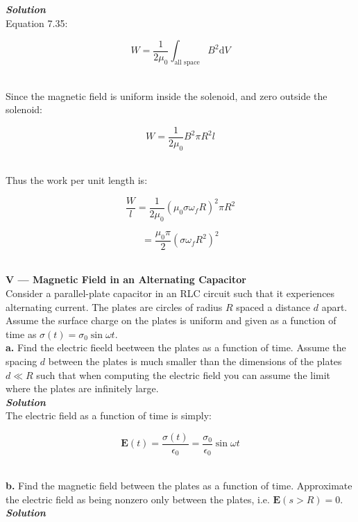 \documentclass[14pt]{extarticle}
\renewcommand{\v}[1]{{\bm #1}}
\newcommand{\bfit}[1]{\textbf{\textit{#1}}}
\renewcommand{\d}{\text{d}}
\newcommand{\eo}{\epsilon_0}
\newcommand{\muo}{\mu_0}
\begin{document}
{\bfit{Solution}} \\ 

Equation 7.35:

$$W = \frac{1}{2\muo} \int_{\text{all space}} B^2 \d V$$ \ 

Since the magnetic field is uniform inside the solenoid, and zero outside the solenoid:

$$W = \frac{1}{2\muo} B^2 \pi R^2 l$$ \ 

Thus the work per unit length is:

$$\frac Wl = \frac{1}{2\muo} (\muo \sigma\omega_f R)^2 \pi R^2$$ 

$$= \frac{\muo \pi}{2} (\sigma\omega_f R^2)^2$$ \ 






\hrulefill 

\hfill 

{\LARGE \bf V --- Magnetic Field in an Alternating Capacitor} \\ 

Consider a parallel-plate capacitor in an RLC circuit such that it experiences alternating current. The plates are circles of radius $R$ spaced a distance $d$ apart. Assume the surface charge on the plates is uniform and given as a function of time as $\sigma(t) = \sigma_0\sin\omega t$.  \\ 

{\Large \bf a.} Find the electric fieeld beetween the plates as a function of time. Assume the spacing $d$ between the plates is much smaller than the dimensions of the plates $ d \ll R$ such that when computing the electric field you can assume the limit where the plates are infinitely large. \\ 

{\bfit{Solution}}  \\ 

The electric field as a function of time is simply: 

$$\v E(t) = \frac{\sigma(t)}{\eo} = \frac{\sigma_0}{\eo} \sin\omega t$$ \ 




\dotfill 

\hfill 

{\Large \bf b.} Find the magnetic field between the plates as a function  of time. Approximate the electric field as being nonzero only between the plates, i.e. $\v E (s>R) = 0$.  \\  

{\bfit{Solution}}  \\ 
\end{document}
